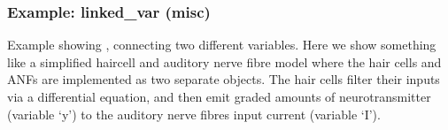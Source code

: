 \documentclass[letterpaper,10pt,english]{manual}
\begin{document}
\resetcurrentobjects
\hypertarget{--doc-examples-misc_linked_var}{}

\hypertarget{index-50}{}\subsubsection{Example: linked\_var (misc)}

Example showing \hyperlink{brian.linked_var}{}, connecting two different \hyperlink{brian.NeuronGroup}{}
variables. Here we show something like a simplified haircell and auditory nerve
fibre model where the hair cells and ANFs are implemented as two separate
\hyperlink{brian.NeuronGroup}{} objects. The hair cells filter their inputs via a
differential equation, and then emit graded amounts of neurotransmitter
(variable `y') to the auditory nerve fibres input current (variable `I').
\end{document}
